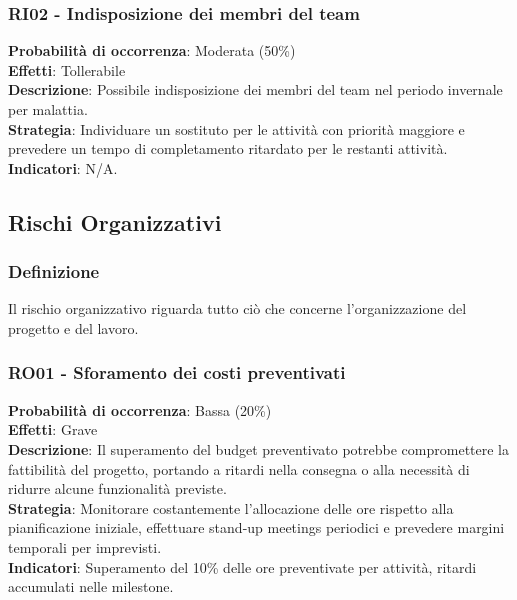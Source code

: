 \documentclass[a4paper,12pt]{article}
\begin{document}
\subsubsection{RI02 - Indisposizione dei membri del team}
\label{RI02}
\textbf{Probabilità di occorrenza}: Moderata (50\%)\\
\textbf{Effetti}: Tollerabile\\
\textbf{Descrizione}: Possibile indisposizione dei membri del team nel periodo invernale per malattia.\\
\textbf{Strategia}: Individuare un sostituto per le attività con priorità maggiore e prevedere un tempo di completamento ritardato per le restanti attività.\\
\textbf{Indicatori}: N/A.





\subsection{Rischi Organizzativi}

\subsubsection{Definizione}
Il rischio organizzativo riguarda tutto ciò che concerne l'organizzazione del progetto e del lavoro.

\subsubsection{RO01 - Sforamento dei costi preventivati}
\label{RO01}
\textbf{Probabilità di occorrenza}: Bassa (20\%)\\
\textbf{Effetti}: Grave\\
\textbf{Descrizione}: Il superamento del budget preventivato potrebbe compromettere la fattibilità del progetto, portando a ritardi nella consegna o alla necessità di ridurre alcune funzionalità previste.\\
\textbf{Strategia}: Monitorare costantemente l'allocazione delle ore rispetto alla pianificazione iniziale, effettuare stand-up meetings periodici e prevedere margini temporali per imprevisti.\\
\textbf{Indicatori}: Superamento del 10\% delle ore preventivate per attività, ritardi accumulati nelle milestone.
\end{document}
